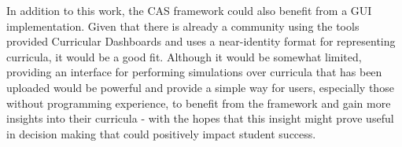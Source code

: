 \documentclass[botnum, fleqn]{unmeethesis}
\begin{document}
  In addition to this work, the CAS framework could also benefit from a GUI implementation. Given that there is already a community using the tools provided Curricular Dashboards and uses a near-identity format for representing curricula, it would be a good fit. Although it would be somewhat limited, providing an interface for performing simulations over curricula that has been uploaded would be powerful and provide a simple way for users, especially those without programming experience, to benefit from the framework and gain more insights into their curricula - with the hopes that this insight might prove useful in decision making that could positively impact student success.

\vspace{4\baselineskip}\vspace{-\parskip} %
\footnotesize %

\end{document}
